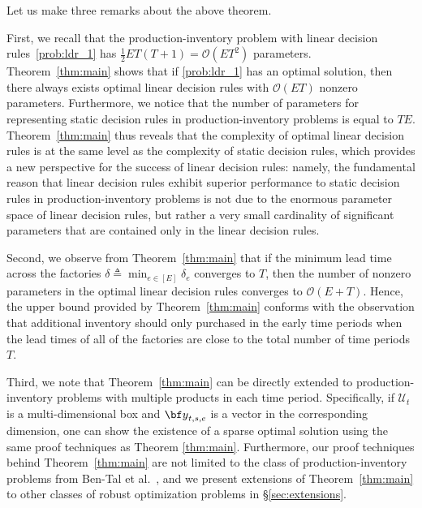 \documentclass[nonblindrev,mnsc]{informs3} %
\newcommand{\by}{{\bf y}}
\begin{document}
\noindent Let us make three remarks about the above theorem.

First, we recall that the production-inventory problem with linear decision rules~\eqref{prob:ldr_1} has  $\frac{1}{2}ET(T+1) = \mathcal{O}(E T^2)$ parameters. Theorem~\ref{thm:main} shows that if \eqref{prob:ldr_1} has an optimal solution, then there always exists optimal linear decision rules with $\mathcal{O}(ET)$  nonzero parameters. %
Furthermore, we notice that the number of parameters for representing static decision rules in production-inventory problems is equal to $TE$. Theorem~\ref{thm:main} thus reveals that the complexity of optimal linear decision rules is at the same level as the complexity of static decision rules, which provides a new perspective for the success of linear decision rules: namely, the fundamental reason that linear decision rules exhibit superior performance to static decision rules in production-inventory problems is not due to the enormous parameter space of linear decision rules, but rather a very small cardinality of significant parameters that are contained only in the linear decision rules.

Second, we observe from Theorem~\ref{thm:main} that if the minimum lead time across the factories $\delta \triangleq\min_{e\in [E]} \delta_e$ converges to $T$, then the number of nonzero parameters in the optimal linear decision rules converges to $\mathcal{O}(E + T)$.  Hence, the upper bound provided by Theorem~\ref{thm:main} conforms with the observation that  additional inventory should only purchased in the early time periods when the lead times of all of the factories are close to the total number of time periods $T$.

Third, 
        we note that Theorem~\ref{thm:main} can be directly extended to production-inventory problems with multiple products in each time period. Specifically, if $\mathcal{U}_t$ is a multi-dimensional box and $\by_{t,s,e}$ is a vector in the corresponding dimension, one can show the existence of a sparse optimal solution using the same proof techniques as Theorem \ref{thm:main}. Furthermore,  our proof techniques behind Theorem~\ref{thm:main} are not limited to the class of production-inventory problems from Ben-Tal et al.~\cite{ben2004adjustable}, and we present extensions of Theorem~\ref{thm:main} to other classes of robust optimization problems in \S\ref{sec:extensions}.
\end{document}
